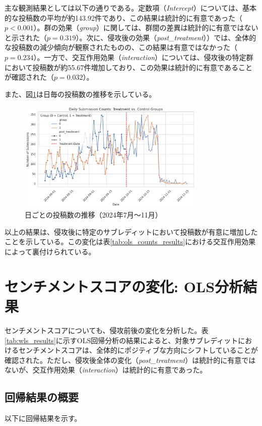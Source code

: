 \documentclass[11pt, a4j]{jreport}
\begin{document}
    主な観測結果としては以下の通りである。定数項（\textit{Intercept}）については、基本的な投稿数の平均が約143.92件であり、この結果は統計的に有意であった（$p < 0.001$）。群の効果（\textit{group}）に関しては、群間の差異は統計的に有意ではないと示された（$p = 0.319$）。次に、侵攻後の効果（\textit{post\_treatment}））では、全体的な投稿数の減少傾向が観察されたものの、この結果は有意ではなかった（$p = 0.234$）。一方で、交互作用効果（\textit{interaction}）については、侵攻後の特定群において投稿数が約55.67件増加しており、この効果は統計的に有意であることが確認された（$p = 0.032$）。

    また、図\ref{fig:submissions_comments_trends}は日毎の投稿数の推移を示している。
    \begin{figure}[H]
        \centering
        \includegraphics[width=0.8\textwidth]{submission_count_plot.png}
        \caption{日ごとの投稿数の推移（2024年7月～11月）}
        \label{fig:submissions_comments_trends}
    \end{figure}

    以上の結果は、侵攻後に特定のサブレディットにおいて投稿数が有意に増加したことを示している。この変化は表\ref{tab:ols_counts_results}における交互作用効果によって裏付けられている。

    \section{センチメントスコアの変化: OLS分析結果}
    センチメントスコアについても、侵攻前後の変化を分析した。表\ref{tab:wls_results}に示すOLS回帰分析の結果によると、対象サブレディットにおけるセンチメントスコアは、全体的にポジティブな方向にシフトしていることが確認された。ただし、侵攻後全体の変化（\textit{post\_treatment}）は統計的に有意ではないが、交互作用効果（\textit{interaction}）は統計的に有意であった。

    \subsection*{回帰結果の概要}
    以下に回帰結果を示す。
\end{document}

